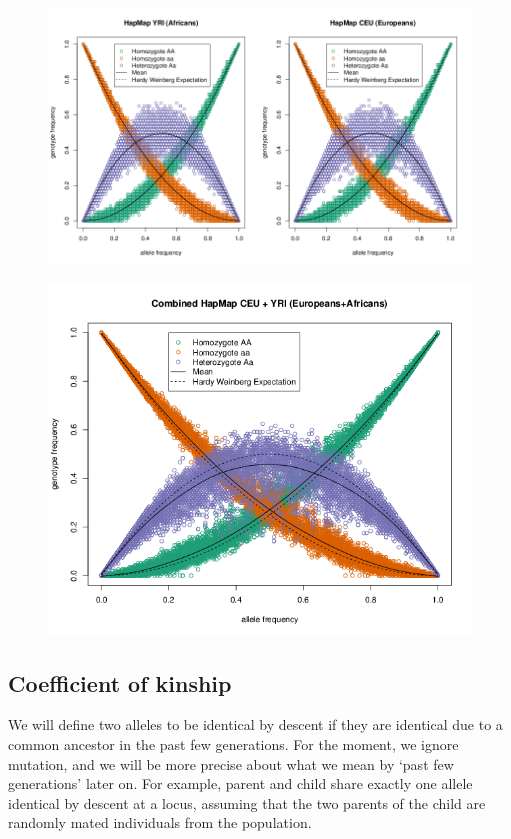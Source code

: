
\begin{figure}
\begin{center}
\includegraphics[width=0.8 \textwidth]{figures/CEU_YRI_separately_HWE.png}
\end{center}
\end{figure}


\begin{figure}
\begin{center}
\includegraphics[width=0.5 \textwidth]{figures/CEU_YRI_together_HWE.png}
\end{center}
\end{figure}




\subsection{Coefficient of kinship}
We will define two alleles to be identical by descent if they are
identical due to a common ancestor in the past few generations. For the moment, we ignore mutation, and we will be more precise about what we mean by `past few generations' later on. For example, parent and child share exactly
one allele identical by descent at a locus, assuming that the two
parents of the child are randomly mated individuals from the population.\\

